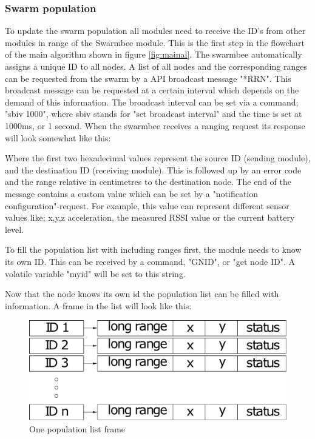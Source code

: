 \documentclass[10pt,a4paper]{article}
\begin{document}
\subsubsection{Swarm population}
To update the swarm population all modules need to receive the ID's from other modules in range of the Swarmbee module. This is the first step in the flowchart of the main algorithm shown in figure  \ref{fig:mainal}. The swarmbee automatically assigns a unique ID to all nodes. A list of all nodes and the corresponding ranges can be requested from the swarm by a API broadcast message "*RRN". This broadcast message can be requested at a certain interval which depends on the demand of this information. The broadcast interval can be set via a command; "sbiv 1000", where sbiv stands for "set broadcast interval" and the time is set at 1000ms, or 1 second. When the swarmbee receives a ranging request its response will look somewhat like this:



Where the first two hexadecimal values represent the source ID (sending module), and the destination ID (receiving module). This is followed up by an error code and the range relative in centimetres to the destination node. The end of the message contains a custom value which can be set by a "notification configuration"-request. For example, this value can represent different sensor values like; x,y,z acceleration, the measured RSSI value or the current battery level.

To fill the population list with including ranges first, the module needs to know its own ID. This can be received by a command, "GNID", or "get node ID". A volatile variable "myid" will be set to this string.

Now that the node knows its own id the population list can be filled with information. A frame in the list will look like this:

\begin{figure}[H]
    \centering
    \includegraphics[scale=0.45]{popframe.pdf}
    \caption{One population list frame}
    \label{fig:frame}
 \end{figure}
\end{document}
